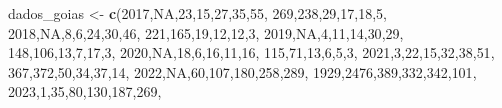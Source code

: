 \documentclass[
]{article}
\newenvironment{Shaded}{\begin{snugshade}}{\end{snugshade}}
\newcommand{\ConstantTok}[1]{\textcolor[rgb]{0.56,0.35,0.01}{#1}}
\newcommand{\DecValTok}[1]{\textcolor[rgb]{0.00,0.00,0.81}{#1}}
\newcommand{\FunctionTok}[1]{\textcolor[rgb]{0.13,0.29,0.53}{\textbf{#1}}}
\newcommand{\NormalTok}[1]{#1}
\newcommand{\OtherTok}[1]{\textcolor[rgb]{0.56,0.35,0.01}{#1}}
\begin{document}
\begin{Shaded}
\begin{Highlighting}[]
\NormalTok{dados\_goias }\OtherTok{\textless{}{-}} \FunctionTok{c}\NormalTok{(}\DecValTok{2017}\NormalTok{,}\ConstantTok{NA}\NormalTok{,}\DecValTok{23}\NormalTok{,}\DecValTok{15}\NormalTok{,}\DecValTok{27}\NormalTok{,}\DecValTok{35}\NormalTok{,}\DecValTok{55}\NormalTok{,}
                \DecValTok{269}\NormalTok{,}\DecValTok{238}\NormalTok{,}\DecValTok{29}\NormalTok{,}\DecValTok{17}\NormalTok{,}\DecValTok{18}\NormalTok{,}\DecValTok{5}\NormalTok{,}
               \DecValTok{2018}\NormalTok{,}\ConstantTok{NA}\NormalTok{,}\DecValTok{8}\NormalTok{,}\DecValTok{6}\NormalTok{,}\DecValTok{24}\NormalTok{,}\DecValTok{30}\NormalTok{,}\DecValTok{46}\NormalTok{,}
                \DecValTok{221}\NormalTok{,}\DecValTok{165}\NormalTok{,}\DecValTok{19}\NormalTok{,}\DecValTok{12}\NormalTok{,}\DecValTok{12}\NormalTok{,}\DecValTok{3}\NormalTok{,}
               \DecValTok{2019}\NormalTok{,}\ConstantTok{NA}\NormalTok{,}\DecValTok{4}\NormalTok{,}\DecValTok{11}\NormalTok{,}\DecValTok{14}\NormalTok{,}\DecValTok{30}\NormalTok{,}\DecValTok{29}\NormalTok{,}
                \DecValTok{148}\NormalTok{,}\DecValTok{106}\NormalTok{,}\DecValTok{13}\NormalTok{,}\DecValTok{7}\NormalTok{,}\DecValTok{17}\NormalTok{,}\DecValTok{3}\NormalTok{,}
               \DecValTok{2020}\NormalTok{,}\ConstantTok{NA}\NormalTok{,}\DecValTok{18}\NormalTok{,}\DecValTok{6}\NormalTok{,}\DecValTok{16}\NormalTok{,}\DecValTok{11}\NormalTok{,}\DecValTok{16}\NormalTok{,}
                \DecValTok{115}\NormalTok{,}\DecValTok{71}\NormalTok{,}\DecValTok{13}\NormalTok{,}\DecValTok{6}\NormalTok{,}\DecValTok{5}\NormalTok{,}\DecValTok{3}\NormalTok{,}
               \DecValTok{2021}\NormalTok{,}\DecValTok{3}\NormalTok{,}\DecValTok{22}\NormalTok{,}\DecValTok{15}\NormalTok{,}\DecValTok{32}\NormalTok{,}\DecValTok{38}\NormalTok{,}\DecValTok{51}\NormalTok{,}
                \DecValTok{367}\NormalTok{,}\DecValTok{372}\NormalTok{,}\DecValTok{50}\NormalTok{,}\DecValTok{34}\NormalTok{,}\DecValTok{37}\NormalTok{,}\DecValTok{14}\NormalTok{,}
               \DecValTok{2022}\NormalTok{,}\ConstantTok{NA}\NormalTok{,}\DecValTok{60}\NormalTok{,}\DecValTok{107}\NormalTok{,}\DecValTok{180}\NormalTok{,}\DecValTok{258}\NormalTok{,}\DecValTok{289}\NormalTok{,}
                \DecValTok{1929}\NormalTok{,}\DecValTok{2476}\NormalTok{,}\DecValTok{389}\NormalTok{,}\DecValTok{332}\NormalTok{,}\DecValTok{342}\NormalTok{,}\DecValTok{101}\NormalTok{,}
               \DecValTok{2023}\NormalTok{,}\DecValTok{1}\NormalTok{,}\DecValTok{35}\NormalTok{,}\DecValTok{80}\NormalTok{,}\DecValTok{130}\NormalTok{,}\DecValTok{187}\NormalTok{,}\DecValTok{269}\NormalTok{,}

\end{Highlighting}
\end{Shaded}
\end{document}
